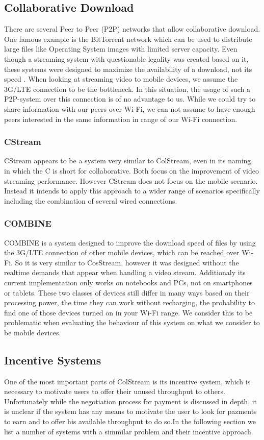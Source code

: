 \subsection{Collaborative Download}
There are several Peer to Peer (P2P) networks that allow collaborative download. One famous example is the BitTorrent network which can be used to distribute large files like Operating System images with limited server capacity. Even though a streaming system with questionable legality was created based on it, these systems were designed to maximize the availability of a download, not its speed \cite{P2P}. When looking at streaming video to mobile devices, we assume the 3G/LTE connection to be the bottleneck. In this situation, the usage of such a P2P-system over this connection is of no advantage to us. While we could try to share information with our peers over Wi-Fi, we can not assume to have enough peers interested in the same information in range of our Wi-Fi connection.  
\subsubsection{CStream}
CStream \cite{CStream} appears to be a system very similar to ColStream, even in its naming, in which the C is short for collaborative. Both focus on the improvement of video streaming performance. However CStream does not focus on the mobile scenario. Instead it intends to apply this approach to a wider range of scenarios specifically including the combination of several wired connections.
\subsubsection{COMBINE}
COMBINE \cite{COMBINE} is a system designed to improve the download speed of files by using the 3G/LTE connection of other mobile devices, which can be reached over Wi-Fi. So it is very similar to CosStream, however it was designed without the realtime demands that appear when handling a video stream. Additionaly its current implementation only works on notebooks and PCs, not on smartphones or tablets. These two classes of devices still differ in many ways based on their processing power, the time they can work without recharging, the probability to find one of those devices turned on in your Wi-Fi range. We consider this to be problematic when evaluating the behaviour of this system on what we consider to be mobile devices.
\subsection{Incentive Systems}
One of the most important parts of ColStream is its incentive system, which is necessary to motivate users to offer their unused throughput to others. Unfortunately while the negotiation process for payment is discussed in depth, it is unclear if the system has any means to motivate the user to look for pazments to earn and to offer his available throughput to do so.In the following section we list a number of systems with a simmilar problem and their incentive approach.
